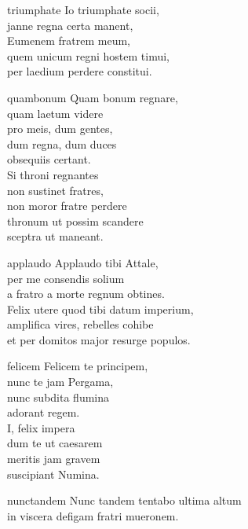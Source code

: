 \documentclass[tocstyle=ref-genre]{ees}
\begin{document}
{\clearpage
\begin{movement}{triumphate}
  \voice[Alto]
  Io triumphate socii,\\
  janne regna certa manent,\\
  Eumenem fratrem meum,\\
  quem unicum regni hostem timui,\\
  per laedium perdere constitui.
\end{movement}

\begin{movement}{quambonum}
  \voice[Alto]
  Quam bonum regnare,\\
  quam laetum videre\\
  pro meis, dum gentes,\\
  dum regna, dum duces\\
  obsequiis certant.\\[1ex]
  Si throni regnantes\\
  non sustinet fratres,\\
  non moror fratre perdere\\
  thronum ut possim scandere\\
  sceptra ut maneant.
\end{movement}

\begin{movement}{applaudo}
  \voice[Basso]
  Applaudo tibi Attale,\\
  per me consendis solium\\
  a fratro a morte regnum obtines.\\
  Felix utere quod tibi datum imperium,\\
  amplifica vires, rebelles cohibe\\
  et per domitos major resurge populos.
\end{movement}

\begin{movement}{felicem}
  \voice[Basso]
  Felicem te principem,\\
  nunc te jam Pergama,\\
  nunc subdita flumina\\
  adorant regem.\\[1ex]
  I, felix impera\\
  dum te ut caesarem\\
  meritis jam gravem\\
  suscipiant Numina.
\end{movement}

\begin{movement}{nunctandem}
  \voice[Alto]
  Nunc tandem tentabo ultima altum\\
  in viscera defigam fratri mueronem.


\end{movement}}
\end{document}
